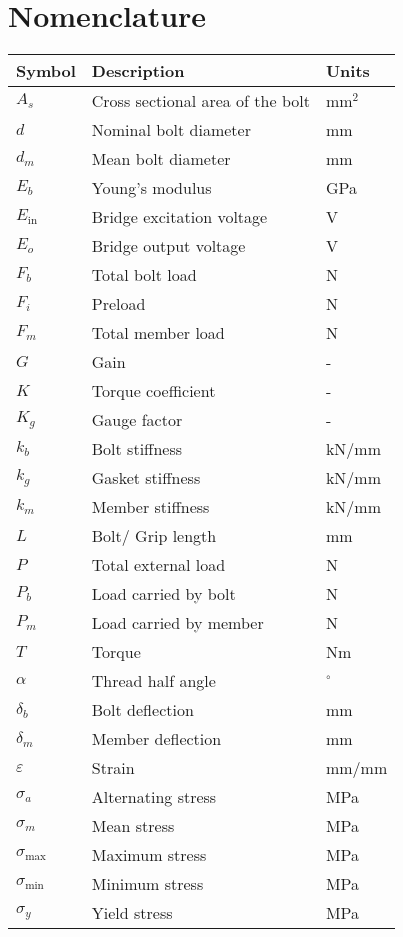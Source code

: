 \section{Nomenclature}  
\begin{longtable}{l l l}
    \toprule
    Symbol & Description & Units \\
    \midrule
    $A_s$ & Cross sectional area of the bolt & mm$^2$ \\
    $d$ & Nominal bolt diameter & mm \\
    $d_m$ & Mean bolt diameter & mm \\
    $E_b$ & Young's modulus & GPa \\
    $E_{\text{in}}$ & Bridge excitation voltage & V \\
    $E_o$ & Bridge output voltage & V \\
    $F_b$ & Total bolt load & N \\
    $F_i$ & Preload & N \\
    $F_m$ & Total member load & N \\
    $G$ & Gain & - \\
    $K$ & Torque coefficient & - \\
    $K_g$ & Gauge factor & - \\
    $k_b$ & Bolt stiffness & kN/mm \\
    $k_g$ & Gasket stiffness & kN/mm \\
    $k_m$ & Member stiffness & kN/mm \\
    $L$ & Bolt/ Grip length & mm \\
    $P$ & Total external load & N \\
    $P_b$ & Load carried by bolt & N \\
    $P_m$ & Load carried by member & N \\
    $T$ & Torque & Nm \\
    $\alpha$ & Thread half angle & $^\circ$ \\
    $\delta_b$ & Bolt deflection & mm \\
    $\delta_m$ & Member deflection & mm \\
    $\varepsilon$ & Strain & mm/mm \\
    $\sigma_a$ & Alternating stress & MPa \\
    $\sigma_m$ & Mean stress & MPa \\
    $\sigma_{\text{max}}$ & Maximum stress & MPa \\
    $\sigma_{\text{min}}$ & Minimum stress & MPa \\
    $\sigma_y$ & Yield stress & MPa \\
    \bottomrule
\end{longtable}